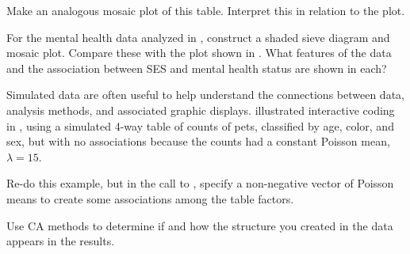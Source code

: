 \documentclass[10pt]{report}\usepackage[]{graphicx}\usepackage[]{color}
\begin{document}
\begin{Exercises}
\begin{enumerate*}
    \item Make an analogous mosaic plot of this table.  Interpret this in relation to the \ca plot.
    \begin{ans}
    \end{ans}
    
  \end{enumerate*}
  
  \exercise For the mental health data analyzed in , construct a shaded sieve diagram
  and mosaic plot. Compare these with the \ca plot shown in .  What features of
  the data and the association between SES and mental health status are shown in each?
  \begin{ans}
  \end{ans}
  
  
  \exercise Simulated data are often useful to help understand the connections between data, analysis
  methods, and associated graphic displays.
   illustrated interactive coding in \R, using a simulated 4-way table
  of counts of pets, classified by age, color, and sex, but with no associations because the counts had
  a constant Poisson mean, $\lambda=15$. 
  \begin{enumerate*}
    \item Re-do this example, but in the call to , specify
    a non-negative vector of Poisson means to create some associations among the table factors.
    \begin{ans}
    \end{ans}
    
    \item Use CA methods to determine if and how the structure you created in the data appears in
    the results.
    \begin{ans}
    \end{ans}
    
  \end{enumerate*}
  

\end{Exercises}
\end{document}
